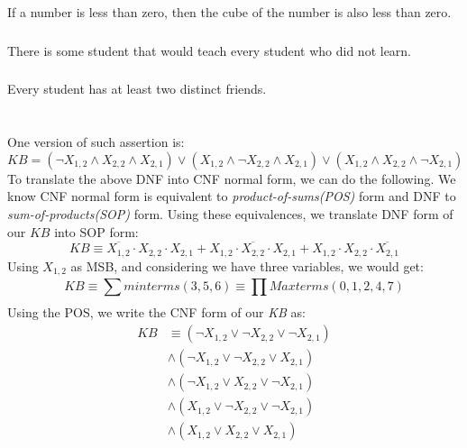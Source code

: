 \documentclass{article}
\begin{document}
    \subsection{}
    \subsubsection{}
    If a number is less than zero, then the cube of the number is also less than zero.
    \subsubsection{}
    There is some student that would teach every student who did not learn.
    \subsubsection{}
    Every student has at least two distinct friends. 
    \section{}
    \subsection{}
    One version of such assertion is:
    $$ KB = (\neg X_{1,2} \wedge X_{2,2} \wedge X_{2,1}) \vee ( X_{1,2} \wedge \neg X_{2,2} \wedge X_{2,1}) \vee ( X_{1,2} \wedge X_{2,2} \wedge \neg X_{2,1}) $$
    To translate the above DNF into CNF normal form, we can do the following. We know CNF normal form is equivalent to \textit{product-of-sums(POS)} form and DNF to \textit{sum-of-products(SOP)} form. Using these equivalences, we translate DNF form of our $ KB $ into SOP form:
    $$
        KB \equiv \overline{X_{1,2}} \cdot X_{2,2} \cdot X_{2,1} + {X_{1,2}} \cdot \overline{X_{2,2}} \cdot X_{2,1} + {X_{1,2}} \cdot X_{2,2} \cdot \overline{X_{2,1}}
    $$
    Using $X_{1, 2}$ as MSB, and considering we have three variables, we would get:
    $$
        KB \equiv \sum_{}^{} minterms(3,5,6) \equiv \prod_{}^{} Maxterms(0,1,2,4,7)
    $$
    Using the POS, we write the CNF form of our \textit{KB} as:
    \begin{align*}
    KB & \equiv 
        (\neg X_{1,2} \vee \neg X_{2,2} \vee \neg X_{2,1}) \\
        & \wedge 
        (\neg X_{1,2} \vee \neg X_{2,2} \vee X_{2,1}) \\ 
        & \wedge 
        (\neg X_{1,2} \vee X_{2,2} \vee \neg X_{2,1}) \\
        & \wedge 
        (X_{1,2} \vee \neg X_{2,2} \vee \neg X_{2,1}) \\
        & \wedge 
        (X_{1,2} \vee X_{2,2} \vee X_{2,1})
    \end{align*}
    \newpage
\end{document}
